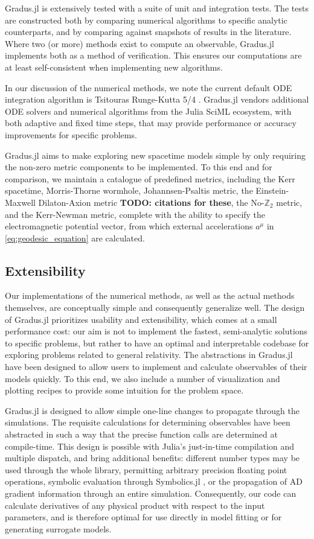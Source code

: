 \documentclass[fleqn,usenatbib]{mnras}
\newcommand{\todo}[1]{{\noindent \bf \color{red} TODO: #1}}
\newcommand{\Gradus}{Gradus.jl }
\begin{document}
\Gradus is extensively tested with a suite of unit and integration tests. The
tests are constructed both by comparing numerical algorithms to specific
analytic counterparts, and by comparing against snapshots of results in the
literature. Where two (or more) methods exist to compute an observable, \Gradus
implements both as a method of verification. This ensures our computations are
at least self-consistent when implementing new algorithms.

In our discussion of the numerical methods, we note the current default ODE
integration algorithm is Tsitouras Runge-Kutta 5/4
\citep{tsitouras_rungekutta_2011}. \Gradus vendors additional ODE solvers and
numerical algorithms from the Julia SciML ecosystem, with both adaptive and
fixed time steps, that may provide performance or accuracy improvements for
specific problems.

\Gradus aims to make exploring new spacetime models simple by only requiring the
non-zero metric components to be implemented. To this end and for comparison, we
maintain a catalogue of predefined metrics, including the Kerr spacetime,
Morris-Thorne wormhole, Johannsen-Psaltis metric, the Einstein-Maxwell
Dilaton-Axion metric \todo{citations for these}, the No-$\mathbb{Z}_2$ metric, and
the Kerr-Newman metric, complete with the ability to specify the electromagnetic
potential vector, from which external accelerations $a^\mu$ in
\eqref{eq:geodesic_equation} are calculated.

\subsection{Extensibility}

Our implementations of the numerical methods, as well as the actual methods
themselves, are conceptually simple and consequently generalize well. The design
of \Gradus prioritizes usability and extensibility, which comes at a small
performance cost: our aim is not to implement the fastest, semi-analytic
solutions to specific problems, but rather to have an optimal and interpretable
codebase for exploring problems related to general relativity. The abstractions
in \Gradus have been designed to allow users to implement and calculate
observables of their models quickly. To this end, we also include a number of
visualization and plotting recipes to provide some intuition for the problem
space.

\Gradus is designed to allow simple one-line changes to propagate through the
simulations. The requisite calculations for determining observables have been
abstracted in such a way that the precise function calls are determined at
compile-time. This design is possible with Julia's just-in-time compilation and
multiple dispatch, and bring additional benefits: different number types may be
used through the whole library, permitting arbitrary precision floating point
operations, symbolic evaluation through Symbolics.jl \citep{symbolics_julia}, or
the propagation of AD gradient information through an entire simulation.
Consequently, our code can calculate derivatives of any physical product with
respect to the input parameters, and is therefore optimal for use directly in
model fitting or for generating surrogate models.
\end{document}
